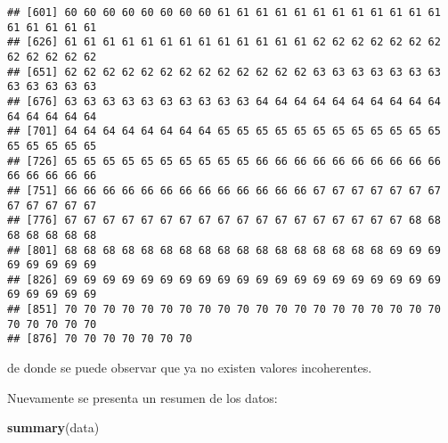 \documentclass[
  spanish,
]{article}
\newenvironment{Shaded}{\begin{snugshade}}{\end{snugshade}}
\newcommand{\KeywordTok}[1]{\textcolor[rgb]{0.13,0.29,0.53}{\textbf{#1}}}
\newcommand{\NormalTok}[1]{#1}
\begin{document}
\begin{verbatim}
## [601] 60 60 60 60 60 60 60 60 61 61 61 61 61 61 61 61 61 61 61 61 61 61 61 61 61
## [626] 61 61 61 61 61 61 61 61 61 61 61 61 61 62 62 62 62 62 62 62 62 62 62 62 62
## [651] 62 62 62 62 62 62 62 62 62 62 62 62 62 63 63 63 63 63 63 63 63 63 63 63 63
## [676] 63 63 63 63 63 63 63 63 63 63 64 64 64 64 64 64 64 64 64 64 64 64 64 64 64
## [701] 64 64 64 64 64 64 64 64 65 65 65 65 65 65 65 65 65 65 65 65 65 65 65 65 65
## [726] 65 65 65 65 65 65 65 65 65 65 66 66 66 66 66 66 66 66 66 66 66 66 66 66 66
## [751] 66 66 66 66 66 66 66 66 66 66 66 66 66 67 67 67 67 67 67 67 67 67 67 67 67
## [776] 67 67 67 67 67 67 67 67 67 67 67 67 67 67 67 67 67 67 68 68 68 68 68 68 68
## [801] 68 68 68 68 68 68 68 68 68 68 68 68 68 68 68 68 68 69 69 69 69 69 69 69 69
## [826] 69 69 69 69 69 69 69 69 69 69 69 69 69 69 69 69 69 69 69 69 69 69 69 69 69
## [851] 70 70 70 70 70 70 70 70 70 70 70 70 70 70 70 70 70 70 70 70 70 70 70 70 70
## [876] 70 70 70 70 70 70 70
\end{verbatim}

de donde se puede observar que ya no existen valores incoherentes.

Nuevamente se presenta un resumen de los datos:

\begin{Shaded}
\begin{Highlighting}[]
\KeywordTok{summary}\NormalTok{(data)}
\end{Highlighting}
\end{Shaded}
\end{document}
